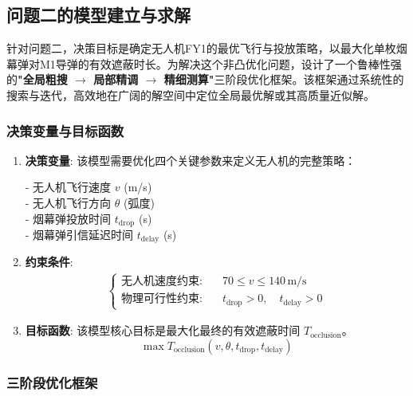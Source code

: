 \documentclass[12pt]{article}
\begin{document}
\begin{CJK}{UTF8}{gbsn}
		
		\subsection{问题二的模型建立与求解}
		
		针对问题二，决策目标是确定无人机FY1的最优飞行与投放策略，以最大化单枚烟幕弹对M1导弹的有效遮蔽时长。为解决这个非凸优化问题，设计了一个鲁棒性强的\textbf{"全局粗搜 $\rightarrow$ 局部精调 $\rightarrow$ 精细测算"}三阶段优化框架。该框架通过系统性的搜索与迭代，高效地在广阔的解空间中定位全局最优解或其高质量近似解。
		
		\subsubsection{决策变量与目标函数}
		
		\begin{enumerate}
			\item \textbf{决策变量}: 该模型需要优化四个关键参数来定义无人机的完整策略：
			
			- 无人机飞行速度 $v$ (m/s)\\
			\indent	- 无人机飞行方向 $\theta$ (弧度)\\
			\indent	- 烟幕弹投放时间 $t_{\text{drop}}$ (s)\\
			\indent	- 烟幕弹引信延迟时间 $t_{\text{delay}}$ (s)
			
			\item \textbf{约束条件}:
			\begin{align}
				\left\{
				\begin{aligned}
					\text{无人机速度约束:} &\quad 70 \le v \le 140\,\text{m/s} \\
					\text{物理可行性约束:} &\quad t_{\text{drop}} > 0,\quad t_{\text{delay}} > 0
				\end{aligned}
				\right.
			\end{align}
			
			\item \textbf{目标函数}: 该模型核心目标是最大化最终的有效遮蔽时间 $T_{\text{occlusion}}$。
			\begin{equation}
				\max T_{\text{occlusion}}(v, \theta, t_{\text{drop}}, t_{\text{delay}})
			\end{equation}
		\end{enumerate}
		
		\subsubsection{三阶段优化框架}
		

\end{CJK}
\end{document}
